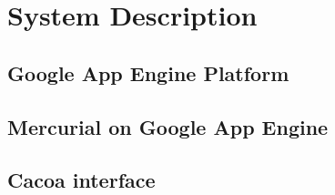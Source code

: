 \chapter{System Description}\label{chap:description}
\section{Google App Engine Platform}\label{sec:gae}
\section{Mercurial on Google App Engine}\label{sec:hg_on_gae}
\section{Cacoa interface}\label{sec:cacoa} 